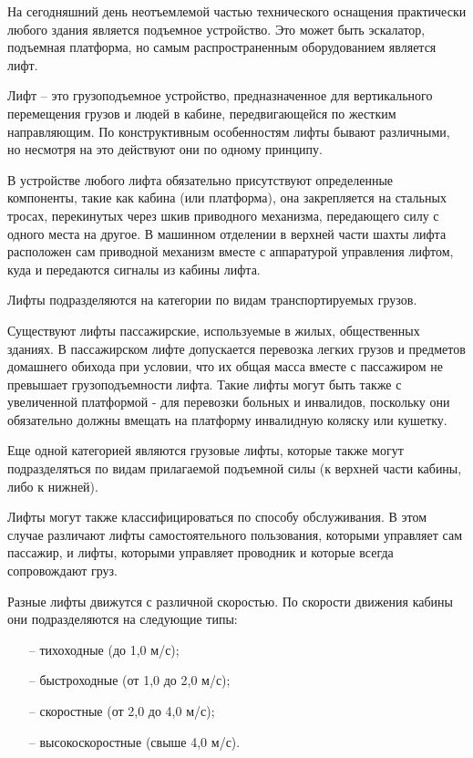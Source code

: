 	На сегодняшний день неотъемлемой частью технического оснащения практически любого здания
		является подъемное устройство. Это может быть эскалатор, подъемная платформа,
		но самым распространенным оборудованием является лифт.

	Лифт -- это грузоподъемное устройство, предназначенное для вертикального перемещения
		грузов и людей в кабине, передвигающейся по жестким направляющим.
		По конструктивным особенностям лифты бывают различными, но несмотря на это действуют они по одному принципу.

	В устройстве любого лифта обязательно присутствуют определенные компоненты,
		такие как кабина (или платформа), она закрепляется на стальных тросах,
		перекинутых через шкив приводного механизма, передающего силу с одного места на другое.
		В машинном отделении в верхней части шахты лифта расположен сам приводной механизм
		вместе с аппаратурой управления лифтом, куда и передаются сигналы из кабины лифта. 

	Лифты подразделяются на категории по видам транспортируемых грузов.

	Существуют лифты пассажирские, используемые в жилых, общественных зданиях.
		В пассажирском лифте допускается перевозка легких грузов и предметов домашнего обихода при условии,
		что их общая масса вместе с пассажиром не превышает грузоподъемности лифта.
		Такие лифты могут быть также с увеличенной платформой - для перевозки больных и инвалидов,
		поскольку они обязательно должны вмещать на платформу инвалидную коляску или кушетку.

	Еще одной категорией являются грузовые лифты, которые также могут подразделяться
		по видам прилагаемой подъемной силы (к верхней части кабины, либо к нижней).

	Лифты могут также классифицироваться по способу обслуживания.
		В этом случае различают лифты самостоятельного пользования,
		которыми управляет сам пассажир, и лифты, которыми управляет проводник и которые всегда сопровождают груз.

	Разные лифты движутся с различной скоростью. По скорости движения кабины они подразделяются на следующие типы:
		\begin{itemize}
			\item[--] тихо­ходные (до 1,0 м/с);
			\item[--] быстроходные (от 1,0 до 2,0 м/с);
			\item[--] скоростные (от 2,0 до 4,0 м/с);
			\item[--] высокоскоростные (свыше 4,0 м/с).
		\end{itemize}

